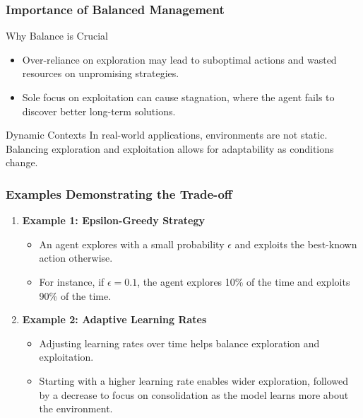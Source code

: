 \documentclass[aspectratio=169]{beamer}
\begin{document}
\begin{frame}[fragile]
    \frametitle{Importance of Balanced Management}
    \begin{block}{Why Balance is Crucial}
        \begin{itemize}
            \item Over-reliance on exploration may lead to suboptimal actions and wasted resources on unpromising strategies.
            \item Sole focus on exploitation can cause stagnation, where the agent fails to discover better long-term solutions.
        \end{itemize}
    \end{block}
    
    \begin{block}{Dynamic Contexts}
        In real-world applications, environments are not static. Balancing exploration and exploitation allows for adaptability as conditions change.
    \end{block}
\end{frame}

\begin{frame}[fragile]
    \frametitle{Examples Demonstrating the Trade-off}
    \begin{enumerate}
        \item \textbf{Example 1: Epsilon-Greedy Strategy}
            \begin{itemize}
                \item An agent explores with a small probability $\epsilon$ and exploits the best-known action otherwise.
                \item For instance, if $\epsilon = 0.1$, the agent explores 10\% of the time and exploits 90\% of the time.
            \end{itemize}

        \item \textbf{Example 2: Adaptive Learning Rates}
            \begin{itemize}
                \item Adjusting learning rates over time helps balance exploration and exploitation.
                \item Starting with a higher learning rate enables wider exploration, followed by a decrease to focus on consolidation as the model learns more about the environment.
            \end{itemize}
    \end{enumerate}
\end{frame}
\end{document}
